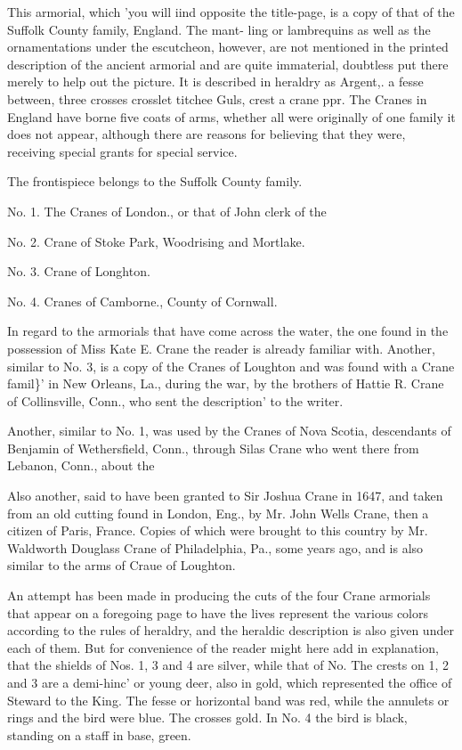 \documentclass{book}
\begin{document}
This armorial, which 'you will iind opposite the title-page, is a 
copy of that of the Suffolk County family, England. The mant- 
ling or lambrequins as well as the ornamentations under the 
escutcheon, however, are not mentioned in the printed description 
of the ancient armorial and are quite immaterial, doubtless put 
there merely to help out the picture. It is described in heraldry 
as Argent,. a fesse between, three crosses crosslet titchee Guls, 
crest a crane ppr. The Cranes in England have borne five coats 
of arms, whether all were originally of one family it does not 
appear, although there are reasons for believing that they were, 
receiving special grants for special service. 

The frontispiece belongs to the Suffolk County family. 

No. 1. The Cranes of London., or that of John clerk of the 

No. 2. Crane of Stoke Park, Woodrising and Mortlake. 

No. 3. Crane of Longhton. 

No. 4. Cranes of Camborne., County of Cornwall. 

In regard to the armorials that have come across the water, the 
one found in the possession of Miss Kate E. Crane the reader is 
already familiar with. Another, similar to No. 3, is a copy of 
the Cranes of Loughton and was found with a Crane famil\}' in 
New Orleans, La., during the war, by the brothers of Hattie R. 
Crane of Collinsville, Conn., who sent the description' to the 
writer. 

Another, similar to No. 1, was used by the Cranes of Nova 
Scotia, descendants of Benjamin of Wethersfield, Conn., through 
Silas Crane who went there from Lebanon, Conn., about the 

Also another, said to have been granted to Sir Joshua Crane in 
1647, and taken from an old cutting found in London, Eng., by 
Mr. John Wells Crane, then a citizen of Paris, France. Copies 
of which were brought to this country by Mr. Waldworth Douglass
Crane of Philadelphia, Pa., some years ago, and is also similar 
to the arms of Craue of Loughton. 

An attempt has been made in producing the cuts of the four 
Crane armorials that appear on a foregoing page to have the lives 
represent the various colors according to the rules of heraldry, 
and the heraldic description is also given under each of them. 
But for convenience of the reader might here add in explanation, 
that the shields of Nos. 1, 3 and 4 are silver, while that of No. 
The crests on 1, 2 and 3 are a demi-hinc' or young deer, also in 
gold, which represented the office of Steward to the King. The 
fesse or horizontal band was red, while the annulets or rings and 
the bird were blue. The crosses gold. In No. 4 the bird is 
black, standing on a staff in base, green. 
\end{document}
